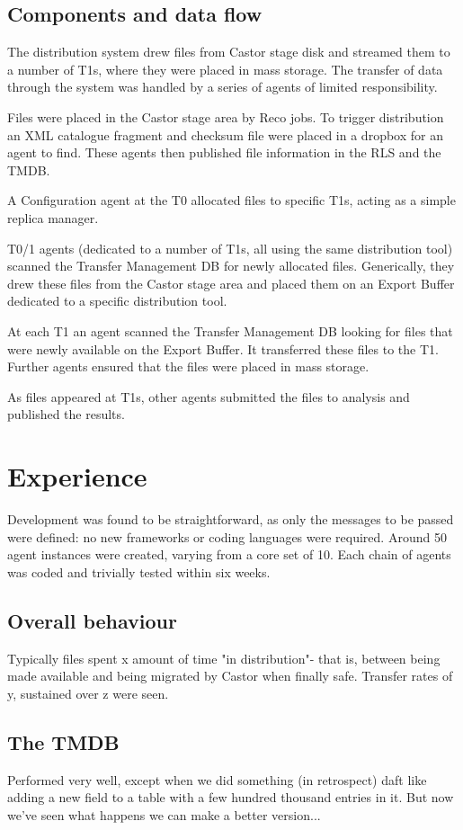 \documentclass{cmspaper}
\begin{document}
\subsection{Components and data flow}
The distribution system drew files from Castor stage disk and streamed
them to a number of T1s, where they were placed in mass storage. The transfer
of data through the system was handled by a series of agents of limited 
responsibility.

Files were placed in the Castor stage area by Reco jobs. To trigger 
distribution an XML catalogue fragment and checksum file were placed in a
dropbox for an agent to find. These agents then published file information
in the RLS and the TMDB.

A Configuration agent at the T0 allocated files to specific T1s, acting as a
simple replica manager.

T0/1 agents (dedicated to a number of T1s, all using the same distribution 
tool) scanned the Transfer Management DB for newly allocated files. 
Generically, they drew these files from the Castor stage area and placed 
them on an Export Buffer dedicated to a specific distribution tool.

At each T1 an agent scanned the Transfer Management DB looking for 
files that were newly available on the Export Buffer. It transferred these 
files to the T1. Further agents ensured that the files were placed in 
mass storage.

As files appeared at T1s, other agents submitted the files to analysis
and published the results.

\section{Experience}
Development was found to be straightforward, as only the messages to be passed
were defined: no new frameworks or coding languages were required. Around 50
agent instances were created, varying from a core set of 10. Each chain of
agents was coded and trivially tested within six weeks.

\subsection{Overall behaviour}
Typically files spent x amount of time "in distribution"- that is, between
being made available and being migrated by Castor when finally safe. Transfer 
rates of y, sustained over z were seen.

\subsection{The TMDB}
Performed very well, except when we did something (in retrospect) daft like
adding a new field to a table with a few hundred thousand entries in it. But
now we've seen what happens we can make a better version...
\end{document}
